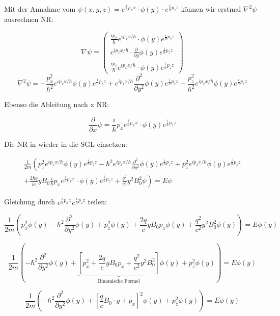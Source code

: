 Mit der Annahme vom \(\psi(x,y,z) = e^{\frac{i}{\hbar}p_xx}\cdot \phi(y)\cdot e^{\frac{i}{\hbar}p_zz}\) können wir erstmal \(\nabla^2\psi\) ausrechnen NR:

\[\nabla\psi = \begin{pmatrix} \frac{ip_x}{\hbar}e^{ip_xx/\hbar}\cdot\phi(y)e^{\frac{i}{\hbar}p_zz} \\ e^{ip_xx/\hbar}\cdot\frac{\partial}{\partial y}\phi(y)e^{\frac{i}{\hbar}p_zz}\\\frac{ip_z}{\hbar}e^{ip_xx/\hbar}\cdot\phi(y)e^{\frac{i}{\hbar}p_zz} \end{pmatrix}  \]
\[\nabla^2\psi =- \frac{p_x^2}{\hbar^2}e^{ip_xx/\hbar}\phi(y)e^{\frac{i}{\hbar}p_zz} + e^{ip_xx/\hbar}\frac{\partial^2}{\partial y^2}\phi(y)e^{\frac{i}{\hbar}p_zz}  - \frac{p_z^2}{\hbar^2}e^{ip_xx/\hbar}\phi(y)e^{\frac{i}{\hbar}p_zz}\]

Ebenso die Ableitung nach x NR:

\[\frac{\partial}{\partial x}\psi =\frac{i}{\hbar}p_x e^{\frac{i}{\hbar}p_xx}\cdot \phi(y) e^{\frac{i}{\hbar}p_zz} \]


Die NR in wieder in die SGL einsetzen:


\[\begin{split} \frac{1}{2m}\left(p_x^2e^{ip_xx/\hbar}\phi(y)e^{\frac{i}{\hbar}p_zz} -\hbar^2e^{ip_xx/\hbar}\frac{\partial^2}{\partial y^2}\phi(y)e^{\frac{i}{\hbar}p_zz} + p_z^2e^{ip_xx/\hbar}\phi(y)e^{\frac{i}{\hbar}p_zz}  \right. \\
\left.  + \frac{2 \hbar q}{ic} yB_0\frac{i}{\hbar}p_x e^{\frac{i}{\hbar}p_xx}\cdot \phi(y)e^{\frac{i}{\hbar}p_zz}  + \frac{q^2}{c^2}y^2B_0^2\psi \right) = E\psi \end{split} \]

Gleichung durch \( e^{\frac{i}{\hbar}p_xx} e^{\frac{i}{\hbar}p_zz} \) teilen:

\[ \frac{1}{2m}\left(p_x^2\phi(y) - \hbar^2 \frac{\partial^2}{\partial y^2}\phi(y) + p_z^2\phi(y) + \frac{2 q}{c} yB_0p_x  \phi(y)  + \frac{q^2}{c^2}y^2B_0^2\phi(y) \right) = E \phi(y) \]


\[  \frac{1}{2m}\left(- \hbar^2\frac{\partial^2}{\partial y^2}\phi(y) +  \underbrace{\left[p_x^2 + \frac{2 q}{c} yB_0p_x   + \frac{q^2}{c^2}y^2B_0^2\right]}_{\text{Binomische Formel}}\phi(y) + p_z^2\phi(y) \right) = E \phi(y) \]

\[  \frac{1}{2m}\left(-\hbar^2 \frac{\partial^2}{\partial y^2}\phi(y) +  \left[\frac{q}{c}B_0\cdot y +  p_x \right]^2\phi(y) + p_z^2\phi(y) \right) = E \phi(y) \]


